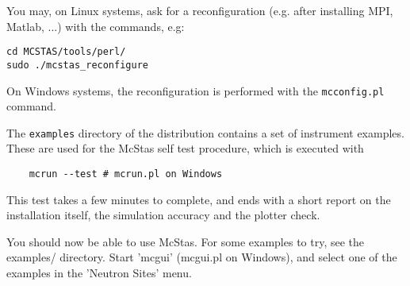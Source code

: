 You may, on Linux systems, ask for a reconfiguration (e.g. after installing MPI, Matlab, ...) with the commands, e.g:
\begin{verbatim}
cd MCSTAS/tools/perl/
sudo ./mcstas_reconfigure
\end{verbatim}
On Windows systems, the reconfiguration is performed with the \verb+mcconfig.pl+ command.

The \verb+examples+ directory of the distribution contains a set of instrument examples. These are used for the McStas self test procedure, which is executed with
\begin{verbatim}
    mcrun --test # mcrun.pl on Windows
\end{verbatim}
This test takes a few minutes to complete, and ends with a short report on the installation itself, the simulation accuracy and the plotter check.

You should now be able to use McStas. For some examples to try, see the
examples/ directory. Start 'mcgui' (mcgui.pl on Windows), and select one of the examples in the 'Neutron Sites' menu.
